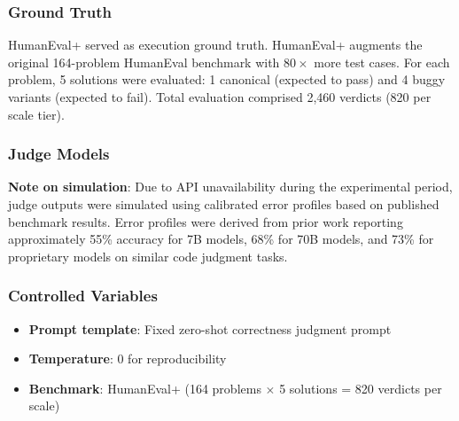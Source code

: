 
\subsubsection{Ground Truth}

HumanEval+ \citep{liu2023evalplus} served as execution ground truth. HumanEval+ augments the original 164-problem HumanEval benchmark with $80\times$ more test cases. For each problem, 5 solutions were evaluated: 1 canonical (expected to pass) and 4 buggy variants (expected to fail). Total evaluation comprised 2,460 verdicts (820 per scale tier).

\subsubsection{Judge Models}

\begin{table}[htbp]
\centering
{}
\end{table}

\textbf{Note on simulation}: Due to API unavailability during the experimental period, judge outputs were simulated using calibrated error profiles based on published benchmark results. Error profiles were derived from prior work reporting approximately 55\% accuracy for 7B models, 68\% for 70B models, and 73\% for proprietary models on similar code judgment tasks.

\subsubsection{Controlled Variables}

\begin{itemize}
\item \textbf{Prompt template}: Fixed zero-shot correctness judgment prompt
\item \textbf{Temperature}: 0 for reproducibility
\item \textbf{Benchmark}: HumanEval+ (164 problems $\times$ 5 solutions = 820 verdicts per scale)
\end{itemize}

